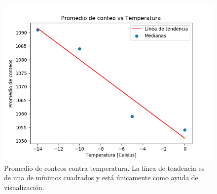 \documentclass[12pt]{article}
\begin{document}
\begin{figure}[H]
   \includegraphics[scale=0.7]{medias.png}
  \caption{Promedio de conteos contra temperatura. La línea de tendencia es de una de mínimos cuadrados y está únicamente como ayuda de visualización. }
  \label{imMedias}
\end{figure}
\end{document}
